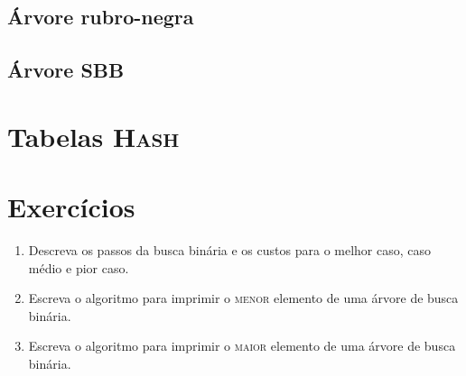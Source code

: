 \subsection{Árvore rubro-negra}


\subsection{Árvore SBB}


\section{Tabelas \textsc{Hash}}


\section{Exercícios}

\begin{enumerate}
\item Descreva os passos da busca binária e os custos para o melhor caso, caso médio
e pior caso.

\item Escreva o algoritmo para imprimir o \textsc{menor} elemento de uma árvore de busca binária.
\item Escreva o algoritmo para imprimir o \textsc{maior} elemento de uma árvore de busca binária.
\end{enumerate}
